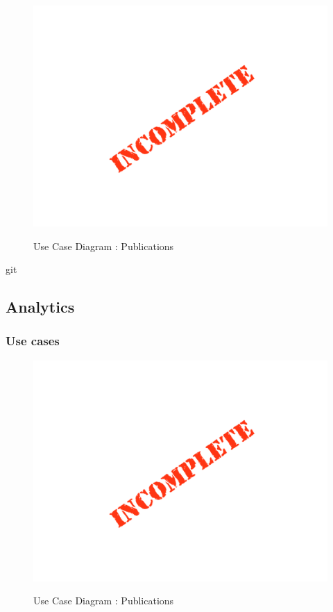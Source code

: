 \documentclass{article}
\begin{document}
		\begin{figure}[H]
		\includegraphics[width=\textwidth]{images/Incomplete.png}  \\
		\caption{Use Case Diagram : Publications}
		\end{figure}git


	\subsection{Analytics}

	\subsubsection{Use cases}

	\begin{figure}[H]
	\includegraphics[width=\textwidth]{images/Incomplete.png}  \\
	\caption{Use Case Diagram : Publications}
	\end{figure}
\end{document}
